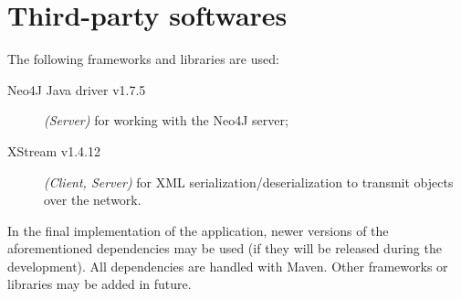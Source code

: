 \section{Third-party softwares}\label{sec:dependencies}

The following frameworks and libraries are used:

\begin{description}
	\item[Neo4J Java driver v1.7.5] \textit{(Server)} for working with the
		Neo4J server;
	\item[XStream v1.4.12] \textit{(Client, Server)} for XML
		serialization/deserialization to transmit objects over the
		network.
\end{description}

In the final implementation of the application, newer versions of the
aforementioned dependencies may be used (if they will be released during the
development). All dependencies are handled with Maven. Other frameworks or
libraries may be added in future.
